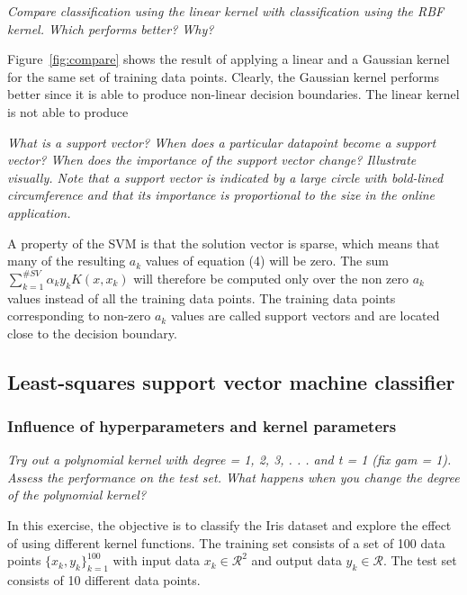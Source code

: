 \documentclass{article}
\begin{document}
\textit{Compare classification using the linear kernel with classification using the RBF kernel.
Which performs better? Why?}

 Figure~\ref{fig:compare} shows the result of applying a linear and a Gaussian kernel for the same set of training data points. Clearly, the Gaussian kernel performs better since it is able to produce non-linear decision boundaries. The linear kernel is not able to produce


\textit{What is a support vector? When does a particular datapoint become a support vector?
When does the importance of the support vector change? Illustrate visually. Note that
a support vector is indicated by a large circle with bold-lined circumference and that
its importance is proportional to the size in the online application.}

A property of the SVM is that the solution vector is sparse, which means that many of the resulting $a_k$ values of equation (4) will be zero. The  sum $\sum_{k=1}^{\#SV}\alpha_ky_kK(x,x_k)$ will therefore be computed only over the non zero $a_k$ values instead of all the training data points. The training data points corresponding to non-zero $a_k$ values are called support vectors and are located close to the decision boundary.


\subsection{
Least-squares support vector machine classifier}

\subsubsection{
Influence of hyperparameters and kernel parameters}


\textit{Try out a polynomial kernel with degree = 1, 2, 3, . . . and t = 1 (fix gam = 1). Assess
the performance on the test set. What happens when you change the degree of the
polynomial kernel?}


In this exercise, the objective is to classify the Iris dataset and explore the effect of using different kernel functions. The training set consists of a set of 100 data points $\{x_k,y_k\}^{100}_{k=1}$ with input data $x_k \in \mathcal{R}^2 $ and output data $y_k \in \mathcal{R} $. The test set consists of 10 different data points.
\end{document}
